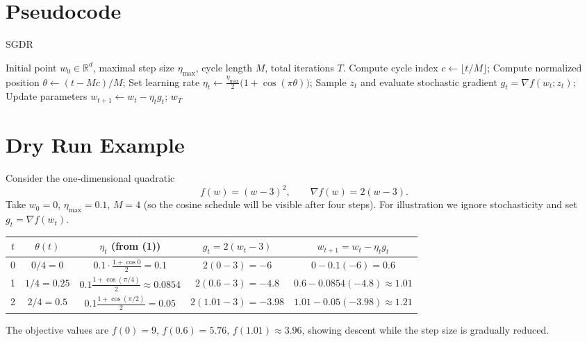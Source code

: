 \documentclass{article}
\begin{document}
\section*{Pseudocode}
\begin{algorithm}[H]
\caption{SGDR}
\begin{algorithmic}[1]
\REQUIRE Initial point $w_0\in\mathbb{R}^d$, maximal step size $\eta_{\max}$,
        cycle length $M$, total iterations $T$.
    \STATE Compute cycle index $c\leftarrow\lfloor t/M\rfloor$;
    \STATE Compute normalized position $\theta\leftarrow (t-Mc)/M$;
    \STATE Set learning rate $\displaystyle\eta_t\leftarrow
          \frac{\eta_{\max}}{2}\bigl(1+\cos(\pi\theta)\bigr)$; 
    \STATE Sample $z_t$ and evaluate stochastic gradient $g_t=\nabla f(w_t;z_t)$;
    \STATE Update parameters $\displaystyle w_{t+1}\leftarrow w_t-\eta_t g_t$; 
\ENDFOR
\RETURN $w_T$
\end{algorithmic}
\end{algorithm}

\section*{Dry Run Example}
Consider the one‑dimensional quadratic
\[
f(w)=(w-3)^2,\qquad \nabla f(w)=2(w-3).
\]
Take $w_0=0$, $\eta_{\max}=0.1$, $M=4$ (so the cosine schedule will be visible after
four steps).  For illustration we ignore stochasticity and set $g_t=\nabla f(w_t)$.

\begin{center}
\begin{tabular}{c|c|c|c|c}
$t$ & $\theta(t)$ & $\eta_t$ (from (1)) & $g_t=2(w_t-3)$ & $w_{t+1}=w_t-\eta_t g_t$\\\hline
0 & $0/4=0$ & $0.1\cdot\frac{1+\cos0}{2}=0.1$ & $2(0-3)=-6$ & $0-0.1(-6)=0.6$\\
1 & $1/4=0.25$ & $0.1\frac{1+\cos(\pi/4)}{2}\approx0.0854$ &
$2(0.6-3)=-4.8$ & $0.6-0.0854(-4.8)\approx1.01$\\
2 & $2/4=0.5$ & $0.1\frac{1+\cos(\pi/2)}{2}=0.05$ &
$2(1.01-3)=-3.98$ & $1.01-0.05(-3.98)\approx1.21$
\end{tabular}
\end{center}
The objective values are $f(0)=9$, $f(0.6)=5.76$, $f(1.01)\approx3.96$,
showing descent while the step size is gradually reduced.
\end{document}
